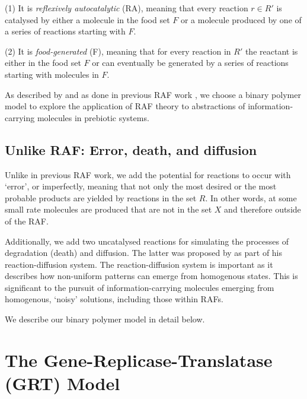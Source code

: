 \documentclass{article}
\begin{document}
(1) It is \textit{reflexively autocatalytic} (RA), meaning that every reaction $r \in R'$ is catalysed by either a molecule in the food set $F$ or a molecule produced by one of a series of reactions starting with $F$.

(2) It is \textit{food-generated} (F), meaning that for every reaction in $R'$ the reactant is either in the food set $F$ or can eventually be generated by a series of reactions starting with molecules in $F$.

As described by \cite{Kauffman1986} and as done in previous RAF work \citep{Hordijk2004,Hordijk2015}, we choose a binary polymer model to explore the application of RAF theory to abstractions of information-carrying molecules in prebiotic systems.  

\subsection{Unlike RAF: Error, death, and diffusion}

Unlike in previous RAF work, we add the potential for reactions to occur with `error', or imperfectly, meaning that not only the most desired or the most probable products are yielded 
by reactions in the set $R$.  In other words, at some small rate molecules are produced that are not in the set $X$ and therefore outside of the RAF.   

Additionally, we add two uncatalysed reactions for simulating the processes of degradation (death) and diffusion.  The latter was proposed by \cite{Turing} as part of his reaction-diffusion system.
The reaction-diffusion system is important as it describes how non-uniform patterns can emerge from homogenous states.  This is significant to the pursuit of information-carrying molecules 
emerging from homogenous, `noisy' solutions, including those within RAFs. 

We describe our binary polymer model in detail below.


\section{The Gene-Replicase-Translatase (GRT) Model}
\end{document}
